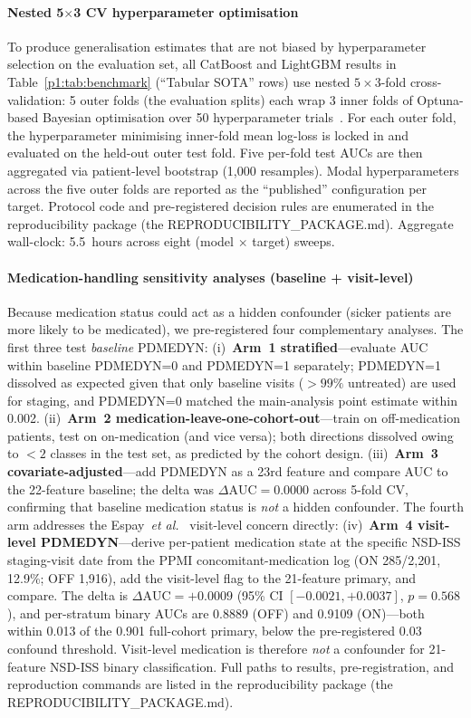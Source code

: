 \documentclass[10pt,letterpaper]{article}
\begin{document}
\paragraph*{Nested 5$\times$3 CV hyperparameter optimisation} To produce generalisation estimates that are not biased by hyperparameter selection on the evaluation set, all CatBoost and LightGBM results in Table~\ref{p1:tab:benchmark} (``Tabular SOTA'' rows) use nested $5 \times 3$-fold cross-validation: 5 outer folds (the evaluation splits) each wrap 3 inner folds of Optuna-based Bayesian optimisation over 50 hyperparameter trials~\cite{cawleytalbot2010}. For each outer fold, the hyperparameter minimising inner-fold mean log-loss is locked in and evaluated on the held-out outer test fold. Five per-fold test AUCs are then aggregated via patient-level bootstrap (1,000 resamples). Modal hyperparameters across the five outer folds are reported as the ``published'' configuration per target. Protocol code and pre-registered decision rules are enumerated in the reproducibility package (the REPRODUCIBILITY\_PACKAGE.md). Aggregate wall-clock: 5.5~hours across eight (model $\times$ target) sweeps.

\paragraph*{Medication-handling sensitivity analyses (baseline + visit-level)} Because medication status could act as a hidden confounder (sicker patients are more likely to be medicated), we pre-registered four complementary analyses. The first three test \emph{baseline} PDMEDYN: (i)~\textbf{Arm~1 stratified}---evaluate AUC within baseline PDMEDYN=0 and PDMEDYN=1 separately; PDMEDYN=1 dissolved as expected given that only baseline visits ($>99\%$ untreated) are used for staging, and PDMEDYN=0 matched the main-analysis point estimate within 0.002. (ii)~\textbf{Arm~2 medication-leave-one-cohort-out}---train on off-medication patients, test on on-medication (and vice versa); both directions dissolved owing to $<2$ classes in the test set, as predicted by the cohort design. (iii)~\textbf{Arm~3 covariate-adjusted}---add PDMEDYN as a 23rd feature and compare AUC to the 22-feature baseline; the delta was $\Delta\mathrm{AUC} = 0.0000$ across 5-fold CV, confirming that baseline medication status is \emph{not} a hidden confounder. The fourth arm addresses the Espay~\emph{et al.}~\cite{espay2025med} visit-level concern directly: (iv)~\textbf{Arm~4 visit-level PDMEDYN}---derive per-patient medication state at the specific NSD-ISS staging-visit date from the PPMI concomitant-medication log (ON 285/2{,}201, 12.9\%; OFF 1{,}916), add the visit-level flag to the 21-feature primary, and compare. The delta is $\Delta\mathrm{AUC}{=}+0.0009$ (95\% CI $[-0.0021, +0.0037]$, $p{=}0.568$), and per-stratum binary AUCs are 0.8889 (OFF) and 0.9109 (ON)---both within 0.013 of the 0.901 full-cohort primary, below the pre-registered 0.03 confound threshold. Visit-level medication is therefore \emph{not} a confounder for 21-feature NSD-ISS binary classification. Full paths to results, pre-registration, and reproduction commands are listed in the reproducibility package (the REPRODUCIBILITY\_PACKAGE.md).
\end{document}
